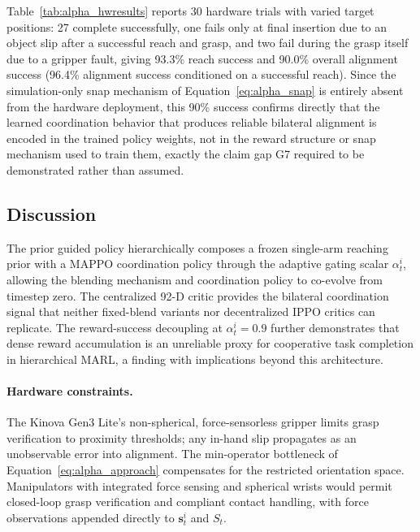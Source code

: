 Table~\ref{tab:alpha_hwresults} reports 30 hardware trials with varied target positions: 27 complete
successfully, one fails only at final insertion due to an object slip after a successful reach and
grasp, and two fail during the grasp itself due to a gripper fault, giving 93.3\% reach success and
90.0\% overall alignment success (96.4\% alignment success conditioned on a successful reach). Since
the simulation-only snap mechanism of Equation~\eqref{eq:alpha_snap} is entirely absent from the
hardware deployment, this 90\% success confirms directly that the learned coordination behavior
that produces reliable bilateral alignment is encoded in the trained policy weights, not in the
reward structure or snap mechanism used to train them, exactly the claim gap G7 required to be
demonstrated rather than assumed.

\subsection{Discussion}\label{sec:alpha_discussion}

The prior guided policy hierarchically composes a frozen single-arm reaching prior with a MAPPO coordination policy
through the adaptive gating scalar $\alpha_t^i$, allowing the blending mechanism and coordination
policy to co-evolve from timestep zero. The centralized 92-D critic provides the bilateral
coordination signal that neither fixed-blend variants nor decentralized IPPO critics can replicate.
The reward-success decoupling at $\alpha_t^i = 0.9$ further demonstrates that dense reward
accumulation is an unreliable proxy for cooperative task completion in hierarchical MARL, a finding
with implications beyond this architecture.

\paragraph{Hardware constraints.} The Kinova Gen3 Lite's non-spherical, force-sensorless gripper
limits grasp verification to proximity thresholds; any in-hand slip propagates as an unobservable
error into alignment. The min-operator bottleneck of Equation~\eqref{eq:alpha_approach} compensates for
the restricted orientation space. Manipulators with integrated force sensing and spherical wrists
would permit closed-loop grasp verification and compliant contact handling, with force observations
appended directly to $\mathbf{s}^i_t$ and $S_t$.

